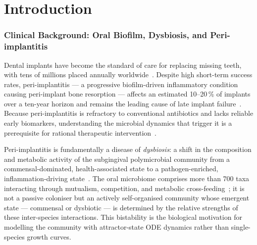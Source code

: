 
\chapter{Introduction}

\subsection{Clinical Background: Oral Biofilm, Dysbiosis, and Peri-implantitis}
\label{sec:intro_clinical}

Dental implants have become the standard of care for replacing missing teeth, with
tens of millions placed annually worldwide~\cite{Kolenbrander2010OralMultispecies}.
Despite high short-term success rates, peri-implantitis --- a progressive
biofilm-driven inflammatory condition causing peri-implant bone resorption --- affects
an estimated 10--20\,\% of implants over a ten-year horizon and remains the leading
cause of late implant failure~\cite{Berglundh2018Peri, Schwarz2022PeriImplantitis}.
Because peri-implantitis is refractory to conventional antibiotics and lacks reliable
early biomarkers, understanding the microbial dynamics that trigger it is a prerequisite
for rational therapeutic intervention~\cite{Lamont2018Periodontal}.

Peri-implantitis is fundamentally a disease of \emph{dysbiosis}: a shift in the
composition and metabolic activity of the subgingival polymicrobial community from a
commensal-dominated, health-associated state to a pathogen-enriched, inflammation-driving
state~\cite{Marsh2003Dental, Hajishengallis2012Dysbiosis}.
The oral microbiome comprises more than 700 taxa interacting through mutualism,
competition, and metabolic cross-feeding~\cite{Kolenbrander2010OralMultispecies,
Dewhirst2010HOMD}; it is not a passive coloniser but an actively self-organised
community whose emergent state --- commensal or dysbiotic --- is determined by the
relative strengths of these inter-species interactions.
This bistability is the biological motivation for modelling the community with
attractor-state ODE dynamics rather than single-species growth curves.

